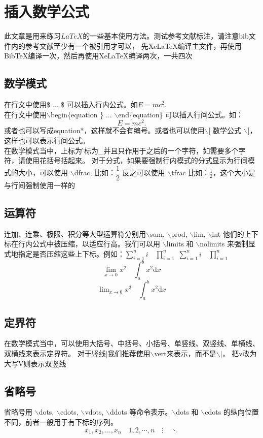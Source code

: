 \section{插入数学公式}
此文章是用来练习$LaTeX$的一些基本使用方法\cite{hasegawa2000plant,sunliguang2016jidi,tester2003na,zhu2002salt,mittler2002oxidative,shi2002regulation,verslues2005new,flowers1995breeding,varshney2005genomics,rengasamy2006world}。测试参考文献标注，请注意bib文件内的参考文献至少有一个被引用才可以，
先XeLaTeX编译主文件，再使用BibTeX编译一次，然后再使用XeLaTeX编译两次，一共四次\cite{sunliguang2016jidi}
\subsection{数学模式}
在行文中使用\$ ... \$ 可以插入行内公式。如$E=mc^2$.\\
在行文中使用$\backslash$begin\{equation \} ... $\backslash$end\{equation\} 可以插入行间公式。如：
\begin{equation}
E=mc^2.
\end{equation}
或者也可以写成equation*，这样就不会有编号。或者也可以使用$\backslash$[ 数学公式 $\backslash$]，
这样也可以表示行间公式。\\在数学模式当中，上标为\^下标为\_并且只作用于之后的一个字符，如需要多个字符，请使用花括号括起来。
对于分式，如果要强制行内模式的分式显示为行间模式的大小，可以使用 $\backslash$dfrac, 
比如：$ \dfrac{1}{2} $
反之可以使用 $\backslash$tfrac
比如：$ \tfrac{1}{2} $，这个大小是与行间强制使用一样的
\subsection{运算符}
连加、连乘、极限、积分等大型运算符分别用$\backslash$sum, $\backslash$prod, $\backslash$lim, $\backslash$int
他们的上下标在行内公式中被压缩，以适应行高。我们可以用 $\backslash$limits 和 $\backslash$nolimits
来强制显式地指定是否压缩这些上下标。例如：$ \sum_{i=1}^n i\quad \prod_{i=1}^n $
$ \sum\limits _{i=1}^n i\quad \prod\limits _{i=1}^n $
\[ \lim_{x\to0}x^2 \quad \int_a^b x^2 \mathrm{d}{x} \]
\[ \lim\nolimits _{x\to0}x^2\quad \int\nolimits_a^b x^2 \mathrm{d}{x} \]
\subsection{定界符}
在数学模式当中，可以使用大括号、中括号、小括号、单竖线、双竖线、单横线、双横线来表示定界符。
对于竖线$\vert$我们推荐使用$\backslash$vert来表示，而不是$\backslash \vert$，
把v改为大写V则表示双竖线
\subsection{省略号}
省略号用 $\backslash$dots, $\backslash$cdots, $\backslash$vdots, $\backslash$ddots 
等命令表示。$\backslash$dots 和 $\backslash$cdots 的纵向位置不同，前者一般用于有下标的序列。
\[ x_1,x_2,\dots ,x_n\quad 1,2,\cdots ,n\quad
\vdots\quad \ddots \]
